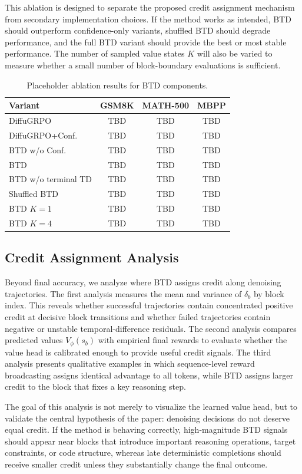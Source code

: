 \documentclass[letterpaper]{article}
\begin{document}
This ablation is designed to separate the proposed credit assignment mechanism from secondary implementation choices. If the method works as intended, BTD should outperform confidence-only variants, shuffled BTD should degrade performance, and the full BTD variant should provide the best or most stable performance. The number of sampled value states $K$ will also be varied to measure whether a small number of block-boundary evaluations is sufficient.

\begin{table}[t]
\centering
\small
\begin{tabular}{lccc}
\hline
Variant & GSM8K & MATH-500 & MBPP \\
\hline
DiffuGRPO & TBD & TBD & TBD \\
DiffuGRPO+Conf. & TBD & TBD & TBD \\
BTD w/o Conf. & TBD & TBD & TBD \\
BTD & TBD & TBD & TBD \\
BTD w/o terminal TD & TBD & TBD & TBD \\
Shuffled BTD & TBD & TBD & TBD \\
BTD $K=1$ & TBD & TBD & TBD \\
BTD $K=4$ & TBD & TBD & TBD \\
\hline
\end{tabular}
\caption{Placeholder ablation results for BTD components.}
\label{tab:ablation}
\end{table}

\subsection{Credit Assignment Analysis}

Beyond final accuracy, we analyze where BTD assigns credit along denoising trajectories. The first analysis measures the mean and variance of $\delta_b$ by block index. This reveals whether successful trajectories contain concentrated positive credit at decisive block transitions and whether failed trajectories contain negative or unstable temporal-difference residuals. The second analysis compares predicted values $V_\phi(s_b)$ with empirical final rewards to evaluate whether the value head is calibrated enough to provide useful credit signals. The third analysis presents qualitative examples in which sequence-level reward broadcasting assigns identical advantage to all tokens, while BTD assigns larger credit to the block that fixes a key reasoning step.

The goal of this analysis is not merely to visualize the learned value head, but to validate the central hypothesis of the paper: denoising decisions do not deserve equal credit. If the method is behaving correctly, high-magnitude BTD signals should appear near blocks that introduce important reasoning operations, target constraints, or code structure, whereas late deterministic completions should receive smaller credit unless they substantially change the final outcome.
\end{document}
